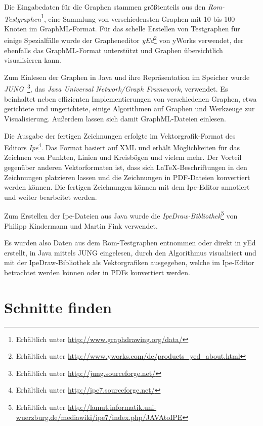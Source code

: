 \documentclass[a4paper]{scrreprt}
\theoremstyle{definition}
\begin{document}
Die Eingabedaten für die Graphen stammen größtenteils aus den \emph{Rom-Testgraphen}\footnote{Erhältlich unter \url{http://www.graphdrawing.org/data/}}, eine Sammlung von verschiedensten Graphen mit 10 bis 100 Knoten im GraphML-Format. Für das schelle Erstellen von Testgraphen für einige Spezialfälle wurde der Grapheneditor \emph{yEd}\footnote{Erhältlich unter \url{http://www.yworks.com/de/products_yed_about.html}} von yWorks verwendet, der ebenfalls das GraphML-Format unterstützt und Graphen übersichtlich visualisieren kann.

Zum Einlesen der Graphen in Java und ihre Repräsentation im Speicher wurde \emph{JUNG}~\cite{jung}\footnote{Erhältlich unter \url{http://jung.sourceforge.net/}}, das \emph{Java Universal Network/Graph Framework}, verwendet. Es beinhaltet neben effizienten Implementierungen von verschiedenen Graphen, etwa gerichtete und ungerichtete, einige Algorithmen auf Graphen und Werkzeuge zur Visualisierung. Außerdem lassen sich damit GraphML-Dateien einlesen.

Die Ausgabe der fertigen Zeichnungen erfolgte im Vektorgrafik-Format des Editors \emph{Ipe}\footnote{Erhältlich unter \url{http://ipe7.sourceforge.net/}}. Das Format basiert auf XML und erhält Möglichkeiten für das Zeichnen von Punkten, Linien und Kreisbögen und vielem mehr. Der Vorteil gegenüber anderen Vektorformaten ist, dass sich \LaTeX-Beschriftungen in den Zeichnungen platzieren lassen und die Zeichnungen in PDF-Dateien konvertiert werden können. Die fertigen Zeichnungen können mit dem Ipe-Editor annotiert und weiter bearbeitet werden.

Zum Erstellen der Ipe-Dateien aus Java wurde die \emph{IpeDraw-Bibliothek}\footnote{Erhältlich unter \url{http://lamut.informatik.uni-wuerzburg.de/mediawiki/ipe7/index.php/JAVAtoIPE}} von Philipp Kindermann und Martin Fink verwendet.

Es wurden also Daten aus dem Rom-Testgraphen entnommen oder direkt in yEd erstellt, in Java mittels JUNG eingelesen, durch den Algorithmus visualisiert und mit der IpeDraw-Bibliothek als Vektorgrafiken ausgegeben, welche im Ipe-Editor betrachtet werden können oder in PDFs konvertiert werden.

\section{Schnitte finden}
\end{document}
